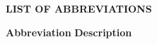 {}
\setlength{\cftparskip}{12pt}

\begin{center}
    \textbf{LIST OF ABBREVIATIONS}
\end{center}
\textbf{Abbreviation} \qquad \qquad \qquad \qquad \qquad \quad \; \textbf{Description} %



\begin{acronym}[\qquad \qquad \qquad \qquad \qquad \qquad \qquad \qquad \quad] %
\end{acronym}



\setlength{\cftparskip}{0pt}

